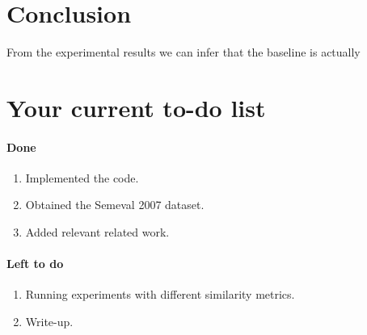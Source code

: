 \documentclass[12pt,letterpaper]{article}
\begin{document}

\section{Conclusion}
From the experimental results we can infer that the baseline is actually
\section*{Your current to-do list}
\paragraph{Done}
\begin{enumerate}
\item Implemented the code.
\item Obtained the Semeval 2007 dataset.
\item Added relevant related work.
\end{enumerate}
\paragraph{Left to do}
\begin{enumerate}
\item Running experiments with different similarity metrics.
\item Write-up.
\end{enumerate}



  
\end{document}
